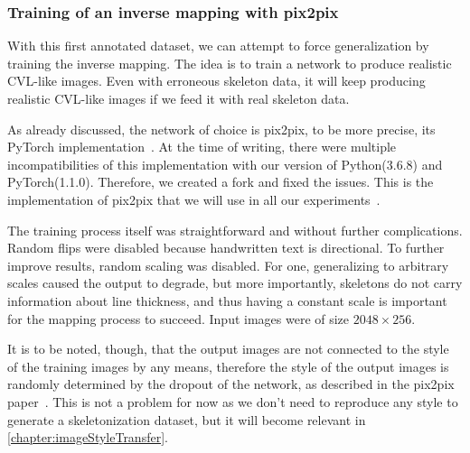 \subsubsection{Training of an inverse mapping with pix2pix}

With this first annotated dataset, we can attempt to force generalization by training the inverse mapping. The idea is to train a network to produce realistic CVL-like images. Even with erroneous skeleton data, it will keep producing realistic CVL-like images if we feed it with real skeleton data.

As already discussed, the network of choice is \gls{pix2pix}, to be more precise, its PyTorch implementation~\cite{pix2pixPytorch}. At the time of writing, there were multiple incompatibilities of this implementation with our version of Python(3.6.8) and PyTorch(1.1.0). Therefore, we created a fork and fixed the issues. This is the implementation of \gls{pix2pix} that we will use in all our experiments~\cite{pix2pixFixed}. 

The training process itself was straightforward and without further complications. Random flips were disabled because handwritten text is directional. To further improve results, random scaling was disabled. For one, generalizing to arbitrary scales caused the output to degrade, but more importantly, skeletons do not carry information about line thickness, and thus having a constant scale is important for the mapping process to succeed.
Input images were of size $2048\times256$.

It is to be noted, though, that the output images are not connected to the style of the training images by any means, therefore the style of the output images is randomly determined by the dropout of the network, as described in the \gls{pix2pix} paper~\cite{pix2pix}.
This is not a problem for now as we don't need to reproduce any style to generate a skeletonization dataset, but it will become relevant in \cref{chapter:imageStyleTransfer}.

